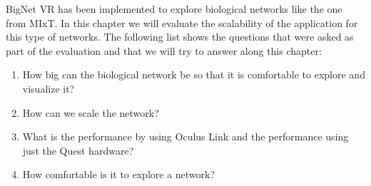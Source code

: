 

BigNet VR has been implemented to explore biological networks like the one from MIxT. In this chapter we will evaluate the scalability of the application for this type of networks. The following list shows the questions that were asked as part of the evaluation and that we will try to answer along this chapter:
\begin{enumerate}
  \item How big can the biological network be so that it is comfortable to explore and visualize it?
  \item How can we scale the network?
  \item What is the performance by using Oculus Link and the performance using just the Quest hardware?
  \item How comfortable is it to explore a network?
\end{enumerate}

